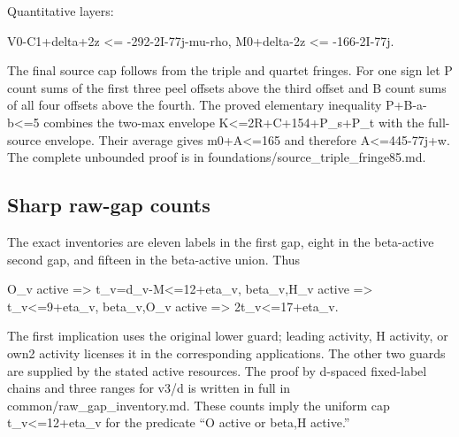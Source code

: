 \documentclass[10pt,a4paper]{article}
\theoremstyle{definition}
\begin{document}
Quantitative layers:

V0-C1+\allowbreak{}delta+\allowbreak{}2z \textless=\allowbreak{} -292-2I-77j-mu-rho,\allowbreak{} M0+\allowbreak{}delta-2z \textless=\allowbreak{}
-166-2I-77j.

The final source cap follows from the triple and quartet fringes. For
one sign let P count sums of the first three peel offsets above the
third offset and B count sums of all four offsets above the fourth. The
proved elementary inequality P+\allowbreak{}B-a-b\textless=\allowbreak{}5 combines the two-max
envelope K\textless=\allowbreak{}2R+\allowbreak{}C+\allowbreak{}154+\allowbreak{}P\_\allowbreak{}s+\allowbreak{}P\_\allowbreak{}t with the full-source envelope.
Their average gives m0+\allowbreak{}A\textless=\allowbreak{}165 and therefore
A\textless=\allowbreak{}445-77j+\allowbreak{}w. The complete unbounded proof is in
foundations/source\_\allowbreak{}triple\_\allowbreak{}fringe85.md.

\hypertarget{sharp-raw-gap-counts}{%
\subsection{Sharp raw-gap counts}\label{sharp-raw-gap-counts}}

The exact inventories are eleven labels in the first gap,\allowbreak{} eight in the
beta-active second gap,\allowbreak{} and fifteen in the beta-active union. Thus

O\_\allowbreak{}v active =\allowbreak{}\textgreater{} t\_\allowbreak{}v=\allowbreak{}d\_\allowbreak{}v-M\textless=\allowbreak{}12+\allowbreak{}eta\_\allowbreak{}v,\allowbreak{} beta\_\allowbreak{}v,\allowbreak{}H\_\allowbreak{}v
active =\allowbreak{}\textgreater{} t\_\allowbreak{}v\textless=\allowbreak{}9+\allowbreak{}eta\_\allowbreak{}v,\allowbreak{} beta\_\allowbreak{}v,\allowbreak{}O\_\allowbreak{}v active
=\allowbreak{}\textgreater{} 2t\_\allowbreak{}v\textless=\allowbreak{}17+\allowbreak{}eta\_\allowbreak{}v.

The first implication uses the original lower guard; leading activity,\allowbreak{} H
activity,\allowbreak{} or own2 activity licenses it in the corresponding
applications. The other two guards are supplied by the stated active
resources. The proof by d-spaced fixed-label chains and three ranges for
v3/d is written in full in common/raw\_\allowbreak{}gap\_\allowbreak{}inventory.md. These counts
imply the uniform cap t\_\allowbreak{}v\textless=\allowbreak{}12+\allowbreak{}eta\_\allowbreak{}v for the predicate ``O
active or beta,\allowbreak{}H active.''
\end{document}
